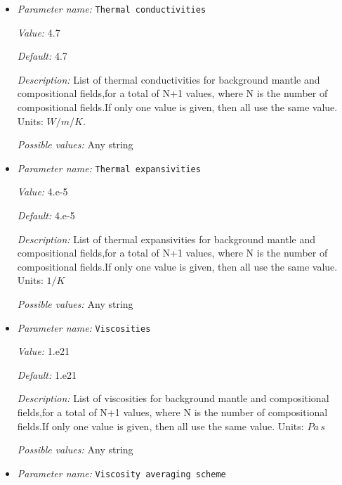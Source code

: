 \begin{itemize}
{\it Possible values:} Any string
\item {\it Parameter name:} {\tt Thermal conductivities}
\label{parameters:Material model/Multicomponent/Thermal conductivities}
\label{parameters:Material_20model/Multicomponent/Thermal_20conductivities}


{\it Value:} 4.7


{\it Default:} 4.7


{\it Description:} List of thermal conductivities for background mantle and compositional fields,for a total of N+1 values, where N is the number of compositional fields.If only one value is given, then all use the same value. Units: $W/m/K$.


{\it Possible values:} Any string
\item {\it Parameter name:} {\tt Thermal expansivities}
\label{parameters:Material model/Multicomponent/Thermal expansivities}
\label{parameters:Material_20model/Multicomponent/Thermal_20expansivities}


{\it Value:} 4.e-5


{\it Default:} 4.e-5


{\it Description:} List of thermal expansivities for background mantle and compositional fields,for a total of N+1 values, where N is the number of compositional fields.If only one value is given, then all use the same value. Units: $1/K$


{\it Possible values:} Any string
\item {\it Parameter name:} {\tt Viscosities}
\label{parameters:Material model/Multicomponent/Viscosities}
\label{parameters:Material_20model/Multicomponent/Viscosities}


{\it Value:} 1.e21


{\it Default:} 1.e21


{\it Description:} List of viscosities for background mantle and compositional fields,for a total of N+1 values, where N is the number of compositional fields.If only one value is given, then all use the same value. Units: $Pa \, s$


{\it Possible values:} Any string
\item {\it Parameter name:} {\tt Viscosity averaging scheme}
\label{parameters:Material model/Multicomponent/Viscosity averaging scheme}
\label{parameters:Material_20model/Multicomponent/Viscosity_20averaging_20scheme}



\end{itemize}
